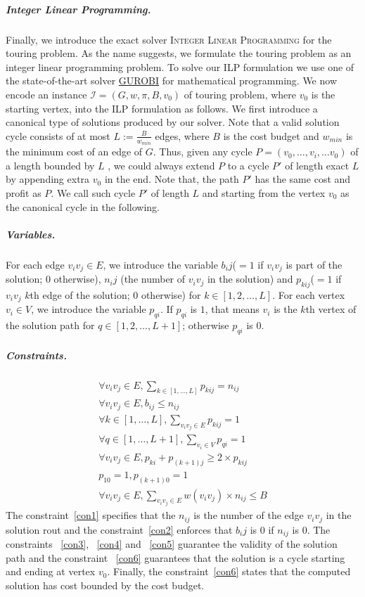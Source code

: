 \documentclass[sigconf,natbib=false]{acmart}
\newcommand{\ilp}{\textsc{Integer Linear Programming}\xspace}
\newcommand{\III}{\mathcal{I}}
\begin{document}
\subparagraph*{\textbf{Integer Linear Programming.}}
Finally, we introduce the exact solver \ilp for  the touring problem. As the name suggests, we formulate the touring problem as an integer linear programming problem. 	
To solve our ILP formulation we use one of the state-of-the-art solver  \href{https://www.gurobi.com/}{GUROBI} for mathematical programming. 
We now encode an instance $\III = (G, w, \pi, B, v_0)$ of touring problem, where $v_0$ is the starting vertex, into the ILP formulation as follows.
We first introduce a canonical type of solutions produced by our solver.
Note that a valid solution cycle consists of at most $L :=\frac{B}{w_{min}}$ edges, where $B$ is the cost budget and $w_{min}$ is the minimum cost of an edge of $G$.
Thus, given any cycle $P = (v_0, \ldots, v_i, \ldots v_0)$ of a length bounded by $L$ , we could always extend $P$ to a cycle $P'$ of length exact $L$ by appending extra $v_0$ in the end. 
Note that, the path $P'$ has the same cost and profit as $P$. 
We call such cycle  $P'$ of length $L$ and starting from the vertex $v_0$ as the canonical cycle in the following. 
\subparagraph*{\textbf{Variables.}}
For each edge $v_iv_j \in E$, we introduce the variable $b_ij$($= 1$ if $v_iv_j$ is part of the solution; $0$ otherwise), $n_ij$ (the number of $v_iv_j$ in the solution) and $p_{kij}$($= 1$ if $v_iv_j$ $k$th edge of the solution; $0$ otherwise) for $k\in [1, 2, \ldots, L]$. 
For each vertex $v_i \in V$, we introduce the variable $p_{qi}$. 
If $p_{qi}$ is $1$, that means $v_i$ is the $k$th vertex of the solution path for $q\in [1, 2, \ldots, L+1]$; otherwise $p_{qi}$ is $0$.
\subparagraph*{\textbf{Constraints.}}
\begin{align}
	\forall v_iv_j\in E, \sum_{k \in [1, \ldots, L]}p_{kij} = n_{ij}\label{con1}\\
	\forall v_iv_j\in E, b_{ij} \leq n_{ij}\label{con2}\\
	\forall k \in [1, \ldots, L], \sum_{v_iv_j\in E}p_{kij} = 1\label{con3}\\
	\forall q \in [1, \ldots, L+1], \sum_{v_i\in V}p_{qi} = 1\label{con4}\\
	\forall v_iv_j\in E, p_{ki} + p_{(k+1)j} \geq 2 \times p_{kij}\label{con5}\\
	p_{10} = 1,  p_{(k+1)0} = 1\label{con6}\\
	\forall v_iv_j\in E, \sum_{v_iv_j\in E} w(v_iv_j) \times n_{ij} \leq B\label{con7}
\end{align}
The constraint~\eqref{con1} specifies that the $n_{ij}$ is the number of the edge $v_iv_j$ in the solution rout and the constraint~\eqref{con2} enforces that $b_ij$ is $0$ if $n_{ij}$ is $0$.
The constraints ~\eqref{con3}, ~\eqref{con4} and  ~\eqref{con5} guarantee the validity of the solution path and the constraint  ~\eqref{con6} guarantees that the solution is a cycle starting and ending at vertex $v_0$.
Finally, the constraint~\eqref{con6} states that the computed solution has cost bounded by the cost budget. 
\end{document}
